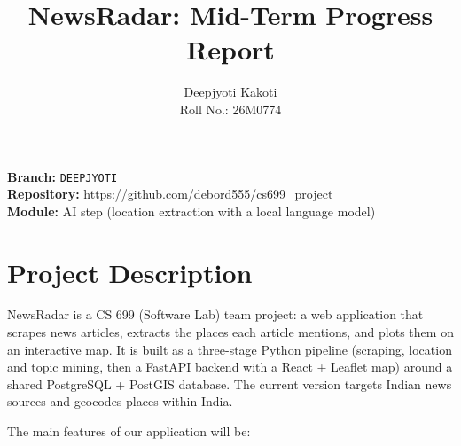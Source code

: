 \documentclass[11pt,a4paper]{article}
\title{NewsRadar: Mid-Term Progress Report}
\author{Deepjyoti Kakoti \\ Roll No.: 26M0774}
\date{}
\begin{document}
\maketitle

\noindent
\textbf{Branch:} \texttt{DEEPJYOTI} \\
\textbf{Repository:} \url{https://github.com/debord555/cs699_project} \\
\textbf{Module:} AI step (location extraction with a local language model)

\section{Project Description}

NewsRadar is a CS 699 (Software Lab) team project: a web application that
scrapes news articles, extracts the places each article mentions, and plots
them on an interactive map. It is built as a three-stage Python pipeline
(scraping, location and topic mining, then a FastAPI backend with a
React + Leaflet map) around a shared PostgreSQL + PostGIS database. The
current version targets Indian news sources and geocodes places within India.

The main features of our application will be:
\end{document}

